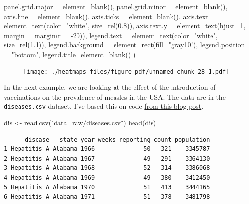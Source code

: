 \documentclass[
  letterpaper,
  DIV=11,
  numbers=noendperiod]{scrreprt}
\newenvironment{Shaded}{\begin{snugshade}}{\end{snugshade}}
\newcommand{\AttributeTok}[1]{\textcolor[rgb]{0.40,0.45,0.13}{#1}}
\newcommand{\DecValTok}[1]{\textcolor[rgb]{0.68,0.00,0.00}{#1}}
\newcommand{\FloatTok}[1]{\textcolor[rgb]{0.68,0.00,0.00}{#1}}
\newcommand{\FunctionTok}[1]{\textcolor[rgb]{0.28,0.35,0.67}{#1}}
\newcommand{\NormalTok}[1]{\textcolor[rgb]{0.00,0.23,0.31}{#1}}
\newcommand{\OtherTok}[1]{\textcolor[rgb]{0.00,0.23,0.31}{#1}}
\newcommand{\SpecialCharTok}[1]{\textcolor[rgb]{0.37,0.37,0.37}{#1}}
\newcommand{\StringTok}[1]{\textcolor[rgb]{0.13,0.47,0.30}{#1}}
\begin{document}
\begin{Shaded}
\begin{Highlighting}[]
    \AttributeTok{panel.grid.major =} \FunctionTok{element\_blank}\NormalTok{(),}
    \AttributeTok{panel.grid.minor =} \FunctionTok{element\_blank}\NormalTok{(),}
    \AttributeTok{axis.line =} \FunctionTok{element\_blank}\NormalTok{(),}
    \AttributeTok{axis.ticks =} \FunctionTok{element\_blank}\NormalTok{(), }
    \AttributeTok{axis.text =} \FunctionTok{element\_text}\NormalTok{(}\AttributeTok{color=}\StringTok{"white"}\NormalTok{, }\AttributeTok{size=}\FunctionTok{rel}\NormalTok{(}\FloatTok{0.8}\NormalTok{)),}
    \AttributeTok{axis.text.y  =} \FunctionTok{element\_text}\NormalTok{(}\AttributeTok{hjust=}\DecValTok{1}\NormalTok{, }\AttributeTok{margin =} \FunctionTok{margin}\NormalTok{(}\AttributeTok{r =} \SpecialCharTok{{-}}\DecValTok{20}\NormalTok{)),}
    \AttributeTok{legend.text =} \FunctionTok{element\_text}\NormalTok{(}\AttributeTok{color=}\StringTok{"white"}\NormalTok{, }\AttributeTok{size=}\FunctionTok{rel}\NormalTok{(}\FloatTok{1.1}\NormalTok{)),}
    \AttributeTok{legend.background =} \FunctionTok{element\_rect}\NormalTok{(}\AttributeTok{fill=}\StringTok{"gray10"}\NormalTok{),}
    \AttributeTok{legend.position =} \StringTok{"bottom"}\NormalTok{,}
    \AttributeTok{legend.title=}\FunctionTok{element\_blank}\NormalTok{()}
\NormalTok{  )}
\end{Highlighting}
\end{Shaded}

\begin{figure}[H]

{\centering \texttt{[image: ./heatmaps\_files/figure-pdf/unnamed-chunk-28-1.pdf]}

}

\end{figure}

In the next example, we are looking at the effect of the introduction of
vaccinations on the prevalence of measles in the USA. The data are in
the \texttt{diseases.csv} dataset. I've based this on code
\href{https://www.royfrancis.com/a-guide-to-elegant-tiled-heatmaps-in-r-2019/}{from
this blog post}.

\begin{Shaded}
\begin{Highlighting}[]
\NormalTok{dis }\OtherTok{\textless{}{-}} \FunctionTok{read.csv}\NormalTok{(}\StringTok{"data\_raw/diseases.csv"}\NormalTok{)}
\FunctionTok{head}\NormalTok{(dis)}
\end{Highlighting}
\end{Shaded}

\begin{verbatim}
      disease   state year weeks_reporting count population
1 Hepatitis A Alabama 1966              50   321    3345787
2 Hepatitis A Alabama 1967              49   291    3364130
3 Hepatitis A Alabama 1968              52   314    3386068
4 Hepatitis A Alabama 1969              49   380    3412450
5 Hepatitis A Alabama 1970              51   413    3444165
6 Hepatitis A Alabama 1971              51   378    3481798
\end{verbatim}
\end{document}
